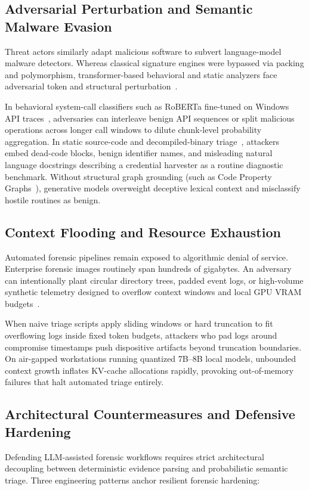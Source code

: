 \subsection{Adversarial Perturbation and Semantic Malware Evasion}
Threat actors similarly adapt malicious software to subvert language-model malware detectors. Whereas classical signature engines were bypassed via packing and polymorphism, transformer-based behavioral and static analyzers face adversarial token and structural perturbation~\cite{clark2025_large, jelodar2026_large, sava2026_triagecpg}.

In behavioral system-call classifiers such as RoBERTa fine-tuned on Windows API traces~\cite{clark2025_large}, adversaries can interleave benign API sequences or split malicious operations across longer call windows to dilute chunk-level probability aggregation. In static source-code and decompiled-binary triage~\cite{jelodar2026_large, sava2026_triagecpg}, attackers embed dead-code blocks, benign identifier names, and misleading natural language docstrings describing a credential harvester as a routine diagnostic benchmark. Without structural graph grounding (such as Code Property Graphs~\cite{sava2026_triagecpg}), generative models overweight deceptive lexical context and misclassify hostile routines as benign.

\subsection{Context Flooding and Resource Exhaustion}
Automated forensic pipelines remain exposed to algorithmic denial of service. Enterprise forensic images routinely span hundreds of gigabytes. An adversary can intentionally plant circular directory trees, padded event logs, or high-volume synthetic telemetry designed to overflow context windows and local GPU VRAM budgets~\cite{zgzler2026_eventdriven, liu2025_autobnb}.

When naive triage scripts apply sliding windows or hard truncation to fit overflowing logs inside fixed token budgets, attackers who pad logs around compromise timestamps push dispositive artifacts beyond truncation boundaries. On air-gapped workstations running quantized 7B--8B local models, unbounded context growth inflates KV-cache allocations rapidly, provoking out-of-memory failures that halt automated triage entirely.

\subsection{Architectural Countermeasures and Defensive Hardening}
Defending LLM-assisted forensic workflows requires strict architectural decoupling between deterministic evidence parsing and probabilistic semantic triage. Three engineering patterns anchor resilient forensic hardening:

